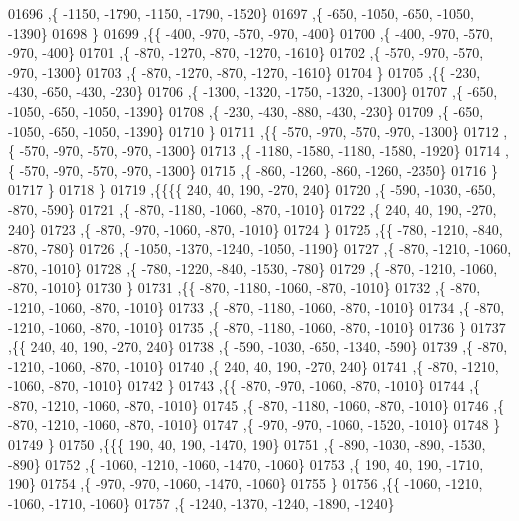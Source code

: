 \begin{DoxyCode}
01696     ,\{ -1150, -1790, -1150, -1790, -1520\}
01697     ,\{  -650, -1050,  -650, -1050, -1390\}
01698     \}
01699    ,\{\{  -400,  -970,  -570,  -970,  -400\}
01700     ,\{  -400,  -970,  -570,  -970,  -400\}
01701     ,\{  -870, -1270,  -870, -1270, -1610\}
01702     ,\{  -570,  -970,  -570,  -970, -1300\}
01703     ,\{  -870, -1270,  -870, -1270, -1610\}
01704     \}
01705    ,\{\{  -230,  -430,  -650,  -430,  -230\}
01706     ,\{ -1300, -1320, -1750, -1320, -1300\}
01707     ,\{  -650, -1050,  -650, -1050, -1390\}
01708     ,\{  -230,  -430,  -880,  -430,  -230\}
01709     ,\{  -650, -1050,  -650, -1050, -1390\}
01710     \}
01711    ,\{\{  -570,  -970,  -570,  -970, -1300\}
01712     ,\{  -570,  -970,  -570,  -970, -1300\}
01713     ,\{ -1180, -1580, -1180, -1580, -1920\}
01714     ,\{  -570,  -970,  -570,  -970, -1300\}
01715     ,\{  -860, -1260,  -860, -1260, -2350\}
01716     \}
01717    \}
01718   \}
01719  ,\{\{\{\{   240,    40,   190,  -270,   240\}
01720     ,\{  -590, -1030,  -650,  -870,  -590\}
01721     ,\{  -870, -1180, -1060,  -870, -1010\}
01722     ,\{   240,    40,   190,  -270,   240\}
01723     ,\{  -870,  -970, -1060,  -870, -1010\}
01724     \}
01725    ,\{\{  -780, -1210,  -840,  -870,  -780\}
01726     ,\{ -1050, -1370, -1240, -1050, -1190\}
01727     ,\{  -870, -1210, -1060,  -870, -1010\}
01728     ,\{  -780, -1220,  -840, -1530,  -780\}
01729     ,\{  -870, -1210, -1060,  -870, -1010\}
01730     \}
01731    ,\{\{  -870, -1180, -1060,  -870, -1010\}
01732     ,\{  -870, -1210, -1060,  -870, -1010\}
01733     ,\{  -870, -1180, -1060,  -870, -1010\}
01734     ,\{  -870, -1210, -1060,  -870, -1010\}
01735     ,\{  -870, -1180, -1060,  -870, -1010\}
01736     \}
01737    ,\{\{   240,    40,   190,  -270,   240\}
01738     ,\{  -590, -1030,  -650, -1340,  -590\}
01739     ,\{  -870, -1210, -1060,  -870, -1010\}
01740     ,\{   240,    40,   190,  -270,   240\}
01741     ,\{  -870, -1210, -1060,  -870, -1010\}
01742     \}
01743    ,\{\{  -870,  -970, -1060,  -870, -1010\}
01744     ,\{  -870, -1210, -1060,  -870, -1010\}
01745     ,\{  -870, -1180, -1060,  -870, -1010\}
01746     ,\{  -870, -1210, -1060,  -870, -1010\}
01747     ,\{  -970,  -970, -1060, -1520, -1010\}
01748     \}
01749    \}
01750   ,\{\{\{   190,    40,   190, -1470,   190\}
01751     ,\{  -890, -1030,  -890, -1530,  -890\}
01752     ,\{ -1060, -1210, -1060, -1470, -1060\}
01753     ,\{   190,    40,   190, -1710,   190\}
01754     ,\{  -970,  -970, -1060, -1470, -1060\}
01755     \}
01756    ,\{\{ -1060, -1210, -1060, -1710, -1060\}
01757     ,\{ -1240, -1370, -1240, -1890, -1240\}

\end{DoxyCode}
